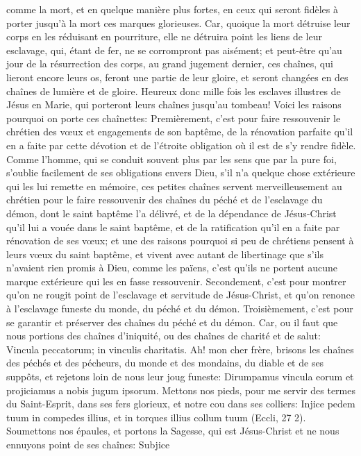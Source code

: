 comme la mort, et en quelque manière plus fortes, en ceux qui seront fidèles à porter jusqu'à la mort ces marques
glorieuses. Car, quoique la mort détruise leur corps en les réduisant en pourriture, elle ne détruira point les liens de
leur esclavage, qui, étant de fer, ne se corrompront pas aisément; et peut-être qu'au jour de la résurrection des
corps, au grand jugement dernier, ces chaînes, qui lieront encore leurs os, feront une partie de leur gloire, et
seront changées en des chaînes de lumière et de gloire. Heureux donc mille fois les esclaves illustres de Jésus en
Marie, qui porteront leurs chaînes jusqu'au tombeau!
 Voici les raisons pourquoi on porte ces chaînettes:
Premièrement, c'est pour faire ressouvenir le chrétien des vœux et engagements de son baptême, de la
rénovation parfaite qu'il en a faite par cette dévotion et de l'étroite obligation où il est de s'y rendre fidèle. Comme
l'homme, qui se conduit souvent plus par les sens que par la pure foi, s'oublie facilement de ses obligations envers
Dieu, s'il n'a quelque chose extérieure qui les lui remette en mémoire, ces petites chaînes servent
merveilleusement au chrétien pour le faire ressouvenir des chaînes du péché et de l'esclavage du démon, dont le
saint baptême l'a délivré, et de la dépendance de Jésus-Christ qu'il lui a vouée dans le saint baptême, et de la
ratification qu'il en a faite par rénovation de ses vœux; et une des raisons pourquoi si peu de chrétiens pensent à
leurs vœux du saint baptême, et vivent avec autant de libertinage que s'ils n'avaient rien promis à Dieu, comme
les païens, c'est qu'ils ne portent aucune marque extérieure qui les en fasse ressouvenir.
 Secondement, c'est pour montrer qu'on ne rougit point de l'esclavage et servitude de Jésus-Christ, et qu'on
renonce à l'esclavage funeste du monde, du péché et du démon.
Troisièmement, c'est pour se garantir et préserver des chaînes du péché et du démon. Car, ou il faut que nous
portions des chaînes d'iniquité, ou des chaînes de charité et de salut: Vincula peccatorum; in vinculis charitatis.
 Ah! mon cher frère, brisons les chaînes des péchés et des pécheurs, du monde et des mondains, du diable
et de ses suppôts, et rejetons loin de nous leur joug funeste: Dirumpamus vincula eorum et projiciamus a nobis
jugum ipsorum. Mettons nos pieds, pour me servir des termes du Saint-Esprit, dans ses fers glorieux, et notre cou
dans ses colliers: Injice pedem tuum in compedes illius, et in torques illius collum tuum (Eccli, 27 2). Soumettons
nos épaules, et portons la Sagesse, qui est Jésus-Christ et ne nous ennuyons point de ses chaînes: Subjice
